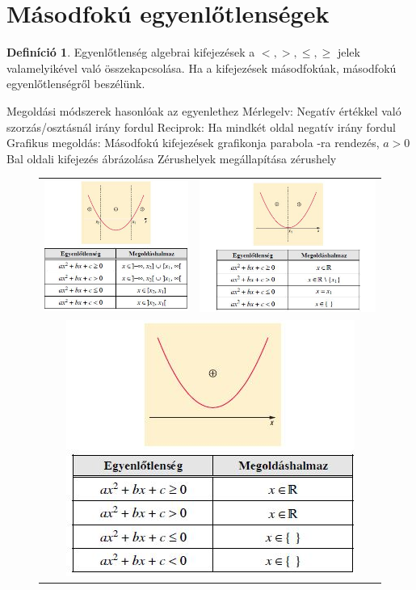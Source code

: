 \documentclass[twoside,12pt]{report}
\theoremstyle{definition}
\newtheorem{definition}[theorem]{Definíció}
\begin{document}
\section{Másodfokú egyenlőtlenségek}
	\begin{definition}
		Egyenlőtlenség algebrai kifejezések a $<,>,\le,\ge$ jelek valamelyikével való összekapcsolása. Ha a kifejezések másodfokúak, másodfokú egyenlőtlenségről beszélünk.
	\end{definition}
	\begin{outline}
		\1 Megoldási módszerek hasonlóak az egyenlethez
			\2 Mérlegelv: Negatív értékkel való szorzás/osztásnál irány fordul
			\2 Reciprok: Ha mindkét oldal negatív irány fordul
			\2 Grafikus megoldás:
				\3 Másodfokú kifejezések grafikonja parabola
				-ra rendezés, $a>0$
				\3 Bal oldali kifejezés ábrázolása
				\3 Zérushelyek megállapítása
				 zérushely
				\begin{figure}[H]
					\centering
					\begin{tabular}{cc}
						\includegraphics[width=0.5\linewidth]{2}&
						\includegraphics[width=0.5\linewidth]{1}\\
						\multicolumn{2}{c}{\includegraphics[width=0.5\linewidth]{0}}
					\end{tabular}
				\end{figure}
	\end{outline}
\end{document}
